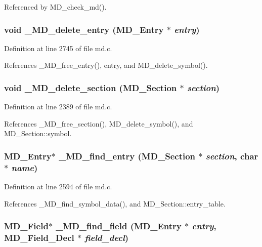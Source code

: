 Referenced by MD\_\-check\_\-md().
\subsubsection{\setlength{\rightskip}{0pt plus 5cm}void \_\-MD\_\-delete\_\-entry (\bf{MD\_\-Entry} $\ast$ {\em entry})}\label{md_8h_0acfdbe44ed962417ea0fcbe76f5d1cb}




Definition at line 2745 of file md.c.

References \_\-MD\_\-free\_\-entry(), entry, and MD\_\-delete\_\-symbol().
\subsubsection{\setlength{\rightskip}{0pt plus 5cm}void \_\-MD\_\-delete\_\-section (\bf{MD\_\-Section} $\ast$ {\em section})}\label{md_8h_3db8411a7ee9c1f869c23accc535913d}




Definition at line 2389 of file md.c.

References \_\-MD\_\-free\_\-section(), MD\_\-delete\_\-symbol(), and MD\_\-Section::symbol.
\subsubsection{\setlength{\rightskip}{0pt plus 5cm}\bf{MD\_\-Entry}$\ast$ \_\-MD\_\-find\_\-entry (\bf{MD\_\-Section} $\ast$ {\em section}, char $\ast$ {\em name})}\label{md_8h_60d979ae5e7bf8577536835680cce03f}




Definition at line 2594 of file md.c.

References \_\-MD\_\-find\_\-symbol\_\-data(), and MD\_\-Section::entry\_\-table.
\subsubsection{\setlength{\rightskip}{0pt plus 5cm}\bf{MD\_\-Field}$\ast$ \_\-MD\_\-find\_\-field (\bf{MD\_\-Entry} $\ast$ {\em entry}, \bf{MD\_\-Field\_\-Decl} $\ast$ {\em field\_\-decl})}\label{md_8h_60bb9dccadf40350e60bd27f6ecf7992}




